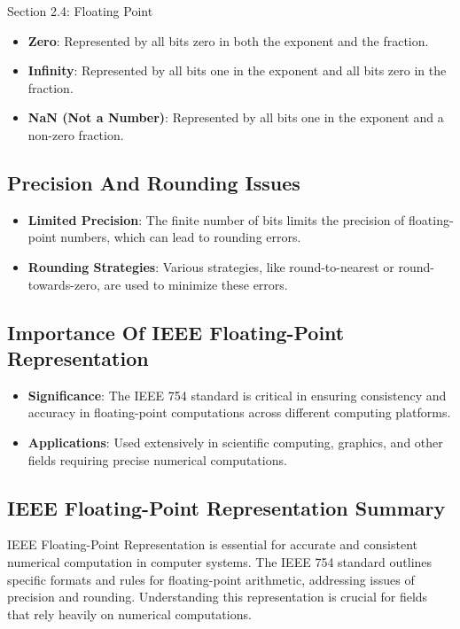 \begin{notes}{Section 2.4: Floating Point}
    \begin{itemize}
        \item \textbf{Zero}: Represented by all bits zero in both the exponent and the fraction.
        \item \textbf{Infinity}: Represented by all bits one in the exponent and all bits zero in the fraction.
        \item \textbf{NaN (Not a Number)}: Represented by all bits one in the exponent and a non-zero fraction.
    \end{itemize}
    
    \subsection*{Precision And Rounding Issues}
    
    \begin{itemize}
        \item \textbf{Limited Precision}: The finite number of bits limits the precision of floating-point numbers, which can lead to rounding errors.
        \item \textbf{Rounding Strategies}: Various strategies, like round-to-nearest or round-towards-zero, are used to minimize these errors.
    \end{itemize}
    
    \subsection*{Importance Of IEEE Floating-Point Representation}
    
    \begin{itemize}
        \item \textbf{Significance}: The IEEE 754 standard is critical in ensuring consistency and accuracy in floating-point computations across different computing platforms.
        \item \textbf{Applications}: Used extensively in scientific computing, graphics, and other fields requiring precise numerical computations.
    \end{itemize}
    
    \subsection*{IEEE Floating-Point Representation Summary}
    
    IEEE Floating-Point Representation is essential for accurate and consistent numerical computation in computer systems. The IEEE 754 standard outlines specific formats and rules for floating-point 
    arithmetic, addressing issues of precision and rounding. Understanding this representation is crucial for fields that rely heavily on numerical computations. \vspace*{1em}


\end{notes}

